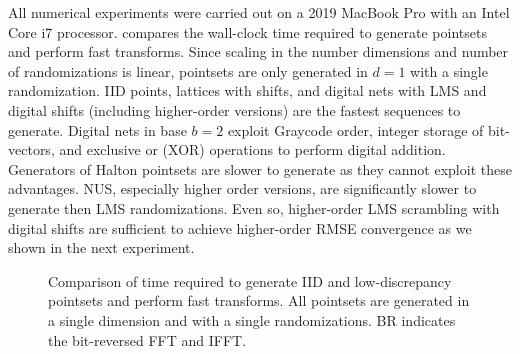 \documentclass[acmsmall]{acmart}
\begin{document}
All numerical experiments were carried out on a 2019 MacBook Pro with an Intel Core i7 processor.  compares the wall-clock time required to generate pointsets and perform fast transforms. Since scaling in the number dimensions and number of randomizations is linear, pointsets are only generated in $d=1$ with a single randomization. IID points, lattices with shifts, and digital nets with LMS and digital shifts (including higher-order versions) are the fastest sequences to generate. Digital nets in base $b=2$ exploit Graycode order, integer storage of bit-vectors, and exclusive or (XOR) operations to perform digital addition. Generators of Halton pointsets are slower to generate as they cannot exploit these advantages. NUS, especially higher order versions, are significantly slower to generate then LMS randomizations. Even so, higher-order LMS scrambling with digital shifts are sufficient to achieve higher-order RMSE convergence as we shown in the next experiment.  

\begin{figure}%
    \centering
    \caption{Comparison of time required to generate IID and low-discrepancy pointsets and perform fast transforms. All pointsets are generated in a single dimension and with a single randomizations. BR indicates the bit-reversed FFT and IFFT.}
    \Description[]{}
    \label{fig:timing}
\end{figure}
\end{document}
